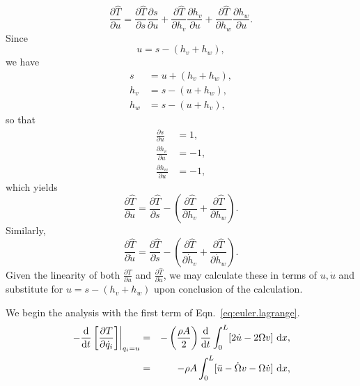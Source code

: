 \begin{equation}
\frac{\partial\hat T}{\partial u} = \frac{\partial \hat T}{\partial s}\frac{\partial s}{\partial u}+\frac{\partial \hat T}{\partial h_v}\frac{\partial h_v}{\partial u}+\frac{\partial \hat T}{\partial h_w}\frac{\partial h_w}{\partial u}.
\end{equation}
Since
\begin{equation}
u = s-(h_v+h_w),
\end{equation}
we have
\begin{eqnarray}
s &= u+(h_v+h_w),\\
h_v &= s-(u+h_w),\\
h_w &= s-(u+h_v),
\end{eqnarray}
so that
\begin{eqnarray}
\frac{\partial s}{\partial u} &= 1,\\
\frac{\partial h_v}{\partial u} &= -1,\\
\frac{\partial h_w}{\partial u} &= -1,
\end{eqnarray}
which yields
\begin{equation}
\frac{\partial\hat T}{\partial u} = \frac{\partial \hat T}{\partial s}-\left(\frac{\partial \hat T}{\partial h_v}+\frac{\partial \hat T}{\partial h_w}\right).
\end{equation}
Similarly,
\begin{equation}
\frac{\partial\hat T}{\partial \dot u} = \frac{\partial \hat T}{\partial \dot s}-\left(\frac{\partial \hat T}{\partial \dot h_v}+\frac{\partial \hat T}{\partial \dot h_w}\right).
\end{equation}
Given the linearity of both $\frac{\partial \hat T}{\partial u}$ and $\frac{\partial \hat T}{\partial \dot u}$, we may calculate these in terms of $u,\dot u$ and substitute for $u=s-(h_v+h_w)$ upon conclusion of the calculation.

We begin the analysis with the first term of Eqn.~\ref{eq:euler.lagrange}.
\begin{eqnarray}
\left.-\frac{\text d}{\text dt}\left[\frac{\partial T}{\partial \dot q_i}\right]\right|_{q_i=u} 
&=& -\left(\frac{\rho A}{2}\right)\frac{\text d}{\text dt}\int_0^L[2\dot u-2\Omega v]\text{ d}x,\\
&=& -\rho A\int_0^L [\ddot u-\dot \Omega v-\Omega \dot v]\text{ d}x,
\end{eqnarray}

